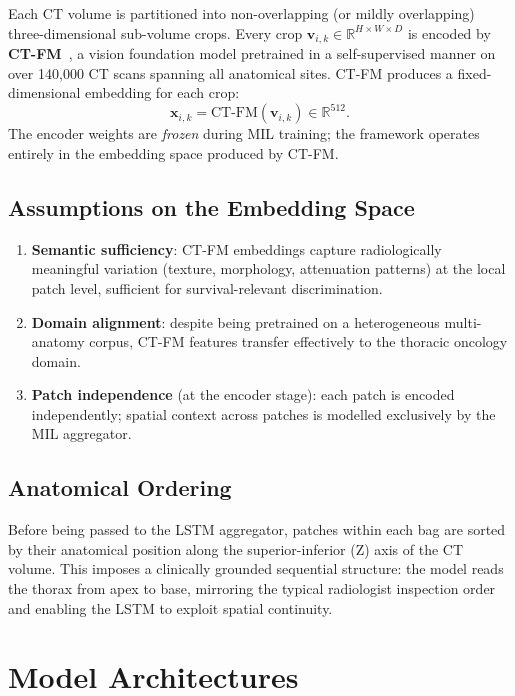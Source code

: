 \documentclass[11pt,a4paper]{article}
\begin{document}
Each CT volume is partitioned into non-overlapping (or mildly overlapping)
three-dimensional sub-volume crops. Every crop $\mathbf{v}_{i,k} \in \mathbb{R}^{H \times W \times D}$
is encoded by \textbf{CT-FM}~\cite{ctfm}, a vision foundation model pretrained
in a self-supervised manner on over 140{,}000 CT scans spanning all anatomical sites.
CT-FM produces a fixed-dimensional embedding for each crop:
\begin{equation}
  \mathbf{x}_{i,k} = \text{CT-FM}(\mathbf{v}_{i,k}) \in \mathbb{R}^{512}.
\end{equation}
The encoder weights are \emph{frozen} during MIL training; the framework operates
entirely in the embedding space produced by CT-FM.

\subsection{Assumptions on the Embedding Space}

\begin{enumerate}
  \item \textbf{Semantic sufficiency}: CT-FM embeddings capture radiologically
        meaningful variation (texture, morphology, attenuation patterns) at the local
        patch level, sufficient for survival-relevant discrimination.
  \item \textbf{Domain alignment}: despite being pretrained on a heterogeneous
        multi-anatomy corpus, CT-FM features transfer effectively to the thoracic oncology domain.
  \item \textbf{Patch independence} (at the encoder stage): each patch is encoded
        independently; spatial context across patches is modelled exclusively by the
        MIL aggregator.
\end{enumerate}

\subsection{Anatomical Ordering}

Before being passed to the LSTM aggregator, patches within each bag are sorted
by their anatomical position along the superior-inferior (Z) axis of the CT volume.
This imposes a clinically grounded sequential structure: the model reads the thorax
from apex to base, mirroring the typical radiologist inspection order and enabling
the LSTM to exploit spatial continuity.

\section{Model Architectures}
\label{sec:models}
\end{document}
